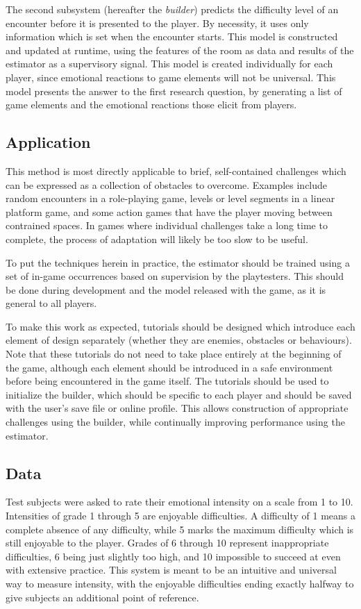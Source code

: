 \documentclass[a4paper]{article}
\begin{document}
\begin{multicols*}{2}
The second subsystem (hereafter the \emph{builder}) predicts the difficulty level of an encounter before it is presented to the player. By necessity, it uses only information which is set when the encounter starts. This model is constructed and updated at runtime, using the features of the room as data and results of the estimator as a supervisory signal. This model is created individually for each player, since emotional reactions to game elements will not be universal. This model presents the answer to the first research question, by generating a list of game elements and the emotional reactions those elicit from players.

\subsection{Application}
This method is most directly applicable to brief, self-contained challenges which can be expressed as a collection of obstacles to overcome. Examples include random encounters in a role-playing game, levels or level segments in a linear platform game, and some action games that have the player moving between contrained spaces. In games where individual challenges take a long time to complete, the process of adaptation will likely be too slow to be useful.

To put the techniques herein in practice, the estimator should be trained using a set of in-game occurrences based on supervision by the playtesters. This should be done during development and the model released with the game, as it is general to all players. 

To make this work as expected, tutorials should be designed which introduce each element of design separately (whether they are enemies, obstacles or behaviours). Note that these tutorials do not need to take place entirely at the beginning of the game, although each element should be introduced in a safe environment before being encountered in the game itself. The tutorials should be used to initialize the builder, which should be specific to each player and should be saved with the user's save file or online profile. This allows construction of appropriate challenges using the builder, while continually improving performance using the estimator.

\subsection{Data} \label{data}
Test subjects were asked to rate their emotional intensity on a scale from 1 to 10. Intensities of grade 1 through 5 are enjoyable difficulties. A difficulty of 1 means a complete absence of any difficulty, while 5 marks the maximum difficulty which is still enjoyable to the player. Grades of 6 through 10 represent inappropriate difficulties, 6 being just slightly too high, and 10 impossible to succeed at even with extensive practice. This system is meant to be an intuitive and universal way to measure intensity, with the enjoyable difficulties ending exactly halfway to give subjects an additional point of reference.


\end{multicols*}
\end{document}
